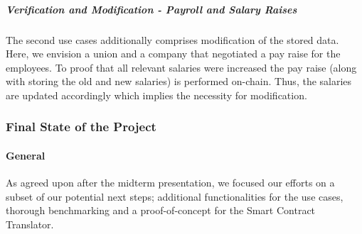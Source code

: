 


\subparagraph{Verification and Modification - Payroll and Salary Raises}
The second use cases additionally comprises modification of the stored data. Here, we envision a union and a company that negotiated a pay raise for the employees. To proof that all relevant salaries were increased the pay raise (along with storing the old and new salaries) is performed on-chain. Thus, the salaries are updated accordingly which implies the necessity for modification.

\subsubsection{Final State of the Project}
\paragraph{General}
As agreed upon after the midterm presentation, we focused our efforts on a subset of our potential next steps; additional functionalities for the use cases, thorough benchmarking and a proof-of-concept for the Smart Contract Translator.

